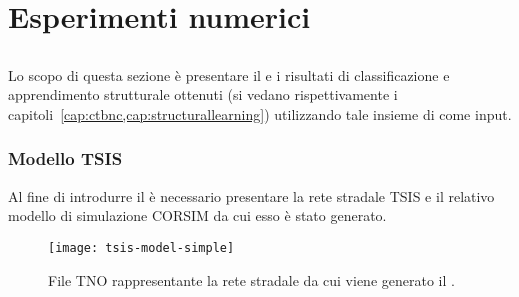 
\chapter{Esperimenti numerici}\label{cap:esperimenti}
\omissis{}

\section{}\label{sec:dataset-1}
Lo scopo di questa sezione è presentare il  e i risultati di classificazione e apprendimento strutturale ottenuti (si vedano rispettivamente i capitoli~\vref{cap:ctbnc,cap:structurallearning}) utilizzando tale insieme di \emph{} come input.

\subsection{Modello TSIS}\label{subsec:tsis-simple-model}
Al fine di introdurre il  è necessario presentare la rete stradale \acs{TSIS} e il relativo modello di simulazione \acs{CORSIM} da cui esso è stato generato.

\begin{sidewaysfigure}
\centering
\texttt{[image: tsis-model-simple]}
\caption[Rete stradale del ]{File \acs{TNO} rappresentante la rete stradale da cui viene generato il .}
\label{fig:tsis-model-simple}
\end{sidewaysfigure}

